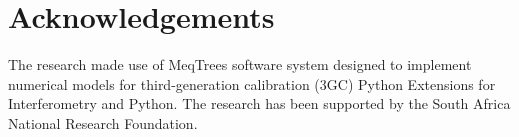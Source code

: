 \documentclass[useAMS,usenatbib]{mn2e}
\begin{document}
\section*{Acknowledgements}
The research  made use of  MeqTrees software system designed to implement numerical models for third-generation calibration (3GC) 
 Python Extensions for Interferometry and Python. The research has been supported by the South Africa National Research Foundation.


\end{document}
